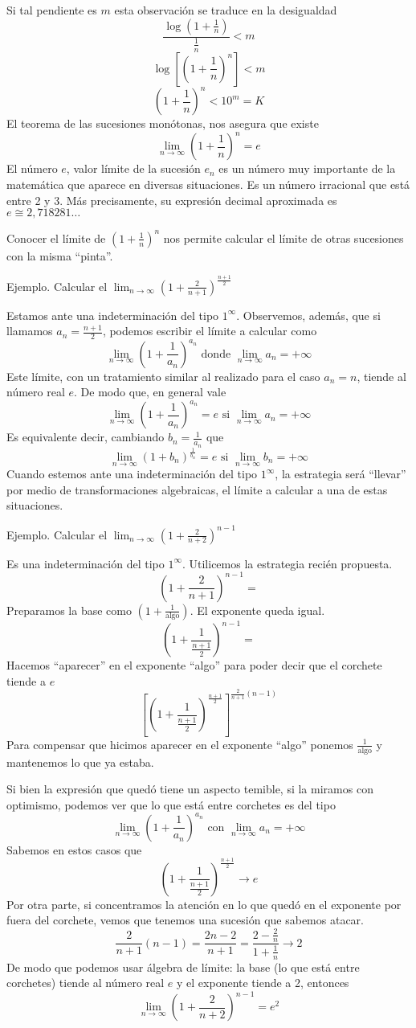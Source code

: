 \documentclass[../Teoría.root.tex]{subfiles}
\begin{document}
Si tal pendiente es \(m\) esta observación se traduce en la desigualdad
\[\frac{\log\left(1+\frac{1}{n}\right)}{\frac{1}{n}}<m\]
\[\log\left[\left(1+\frac{1}{n}\right)^n\right]<m\]
\[\left(1+\frac{1}{n}\right)^n<10^m=K\]
El teorema de las sucesiones monótonas, nos asegura que existe \[\lim_{n\to\infty}\left(1+\frac{1}{n}\right)^n=e\]
El número \(e\), valor límite de la sucesión \(e_n\) es un número muy importante de la matemática que aparece en diversas situaciones.
Es un número irracional que está entre 2 y 3.
Más precisamente, su expresión decimal aproximada es \(e\cong2,718281\dots\)

Conocer el límite de \(\left(1+\frac{1}{n}\right)^n\) nos permite calcular el límite de otras sucesiones con la misma “pinta”.

Ejemplo.
Calcular el \(\lim_{n\to\infty}\left(1+\frac{2}{n+1}\right)^{\frac{n+1}{2}}\)

Estamos ante una indeterminación del tipo \(1^\infty\).
Observemos, además, que si llamamos \(a_n=\frac{n+1}{2}\), podemos escribir el límite a calcular como
\[\lim_{n\to\infty}\left(1+\frac{1}{a_n}\right)^{a_n}\text{ donde }\lim_{n\to\infty}a_n=+\infty\]
Este límite, con un tratamiento similar al realizado para el caso \(a_n=n\), tiende al número real \(e\).
De modo que, en general vale
\[\lim_{n\to\infty}\left(1+\frac{1}{a_n}\right)^{a_n}=e\text{ si }\lim_{n\to\infty}a_n=+\infty\]
Es equivalente decir, cambiando \(b_n=\frac{1}{a_n}\) que
\[\lim_{n\to\infty}\left(1+b_n\right)^{\frac{1}{b_n}}=e\text{ si }\lim_{n\to\infty}b_n=+\infty\]
Cuando estemos ante una indeterminación del tipo \(1^\infty\), la estrategia será “llevar” por medio de transformaciones algebraicas, el límite a calcular a una de estas situaciones.

Ejemplo.
Calcular el \(\lim_{n\to\infty}\left(1+\frac{2}{n+2}\right)^{n-1}\)

Es una indeterminación del tipo \(1^\infty\).
Utilicemos la estrategia recién propuesta.
\[\left(1+\frac{2}{n+1}\right)^{n-1}=\]
Preparamos la base como \(\left(1+\frac{1}{\text{algo}}\right)\).
El exponente queda igual.
\[\left(1+\frac{1}{\frac{n+1}{2}}\right)^{n-1}=\]
Hacemos ``aparecer'' en el exponente ``algo'' para poder decir que el corchete tiende a \(e\)
\[\left[\left(1+\frac{1}{\frac{n+1}{2}}\right)^{\frac{n+1}{2}}\right]^{\frac{2}{n+1}(n-1)}\]
Para compensar que hicimos aparecer en el exponente ``algo'' ponemos \(\frac{1}{\text{algo}}\) y mantenemos lo que ya estaba.

Si bien la expresión que quedó tiene un aspecto temible, si la miramos con optimismo, podemos ver que lo que está entre corchetes es del tipo
\[\lim_{n\to\infty}\left(1+\frac{1}{a_n}\right)^{a_n}\text{ con }\lim_{n\to\infty}a_n=+\infty\]
Sabemos en estos casos que
\[\left(1+\frac{1}{\frac{n+1}{2}}\right)^{\frac{n+1}{2}}\rightarrow e\]
Por otra parte, si concentramos la atención en lo que quedó en el exponente por fuera del corchete, vemos que tenemos una sucesión que sabemos atacar.
\[\frac{2}{n+1}(n-1)=\frac{2n-2}{n+1}=\frac{2-\frac{2}{n}}{1+\frac{1}{n}}\rightarrow2\]
De modo que podemos usar álgebra de límite:
la base (lo que está entre corchetes) tiende al número real \(e\) y el exponente tiende a 2, entonces
\[\lim_{n\to\infty}\left(1+\frac{2}{n+2}\right)^{n-1}=e^2\]
\end{document}
